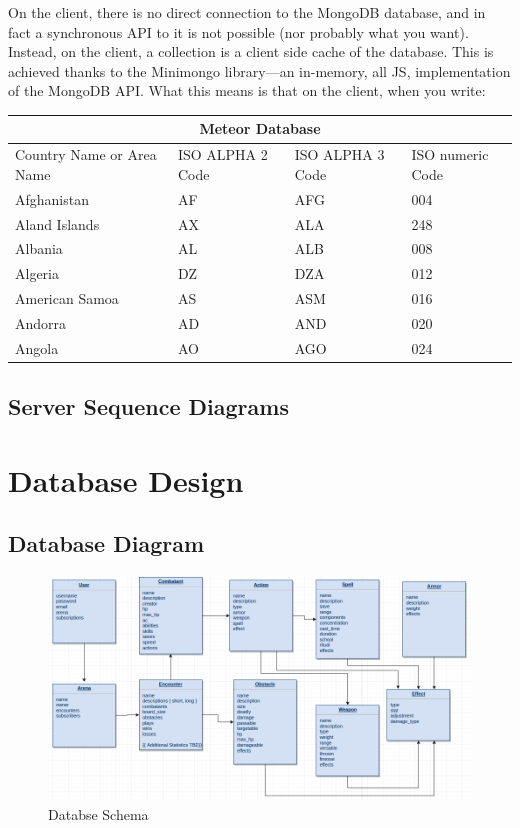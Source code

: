 \documentclass[12pt,a4paper]{report}
\begin{document}
		
		
		On the client, there is no direct connection to the MongoDB database, and in fact a synchronous API to it is not possible (nor probably what you want). Instead, on the client, a collection is a client side cache of the database. This is achieved thanks to the Minimongo library—an in-memory, all JS, implementation of the MongoDB API. What this means is that on the client, when you write:
		
		
		
		\begin{tabular}{ |p{3cm}||p{3cm}|p{3cm}|p{3cm}|  }
			\hline
			\multicolumn{4}{|c|}{Meteor Database} \\
			\hline
			Country Name     or Area Name& ISO ALPHA 2 Code &ISO ALPHA 3 Code&ISO numeric Code\\
			\hline
			Afghanistan   & AF    &AFG&   004\\
			Aland Islands&   AX  & ALA   &248\\
			Albania &AL & ALB&  008\\
			Algeria    &DZ & DZA&  012\\
			American Samoa&   AS  & ASM&016\\
			Andorra& AD  & AND   &020\\
			Angola& AO  & AGO&024\\
			\hline
		\end{tabular}
		
	\subsection{Server Sequence Diagrams}

\newpage
\section{Database Design}
	\subsection {Database Diagram}
		\begin{figure}[h]
			\centering
			\includegraphics[scale=.4]{database_schema}
			\caption{Databse Schema}
			\label{fig: Databse Schema }
		\end{figure}
\end{document}
